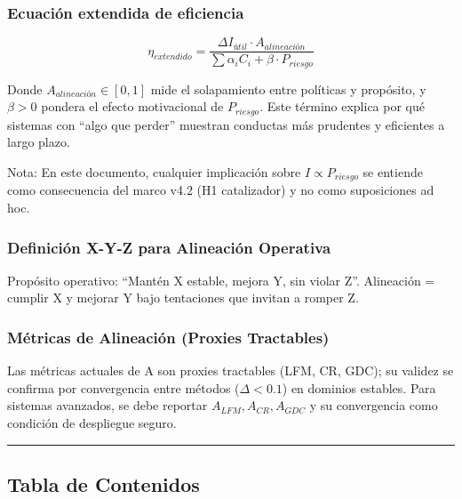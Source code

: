 \subsubsection{Ecuación extendida de
eficiencia}\label{ecuaciuxf3n-extendida-de-eficiencia}

\[ \eta_{extendido} = \frac{\Delta I_{útil} \cdot A_{alineación}}{\sum \alpha_i C_i + \beta \cdot P_{riesgo}} \]

Donde \(A_{alineación} \in [0,1]\) mide el solapamiento entre políticas
y propósito, y \(\beta>0\) pondera el efecto motivacional de
\(P_{riesgo}\). Este término explica por qué sistemas con ``algo que
perder'' muestran conductas más prudentes y eficientes a largo plazo.

Nota: En este documento, cualquier implicación sobre
\(I \propto P_{riesgo}\) se entiende como consecuencia del marco v4.2
(H1 catalizador) y no como suposiciones ad hoc.

\subsubsection{Definición X-Y-Z para Alineación
Operativa}\label{definiciuxf3n-x-y-z-para-alineaciuxf3n-operativa}

Propósito operativo: ``Mantén X estable, mejora Y, sin violar Z''.
Alineación = cumplir X y mejorar Y bajo tentaciones que invitan a romper
Z.

\subsubsection{Métricas de Alineación (Proxies
Tractables)}\label{muxe9tricas-de-alineaciuxf3n-proxies-tractables}

Las métricas actuales de A son proxies tractables (LFM, CR, GDC); su
validez se confirma por convergencia entre métodos (\(\Delta<0.1\)) en
dominios estables. Para sistemas avanzados, se debe reportar
\(A_{LFM}, A_{CR}, A_{GDC}\) y su convergencia como condición de
despliegue seguro.

\begin{center}\rule{0.5\linewidth}{0.5pt}\end{center}

\subsection{Tabla de Contenidos}\label{tabla-de-contenidos}

